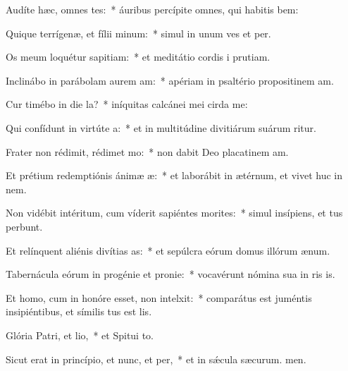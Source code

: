 \item Audíte hæc, omnes tes:~* áuribus percípite omnes, qui habitis bem:
\item Quique terrígenæ, et fílii minum:~* simul in unum ves et per.
\item Os meum loquétur sapitiam:~* et meditátio cordis i prutiam.
\item Inclinábo in parábolam aurem am:~* apériam in psaltério propositinem am.
\item Cur timébo in die la?~* iníquitas calcánei mei cirda me:
\item Qui confídunt in virtúte a:~* et in multitúdine divitiárum suárum ritur.
\item Frater non rédimit, rédimet mo:~* non dabit Deo placatinem am.
\item Et prétium redemptiónis ánimæ æ:~* et laborábit in ætérnum, et vivet huc in nem.
\item Non vidébit intéritum, cum víderit sapiéntes morites:~* simul insípiens, et tus perbunt.
\item Et relínquent aliénis divítias as:~* et sepúlcra eórum domus illórum  ænum.
\item Tabernácula eórum in progénie et pronie:~* vocavérunt nómina sua in ris is.
\item Et homo, cum in honóre esset, non intelxit:~* comparátus est juméntis insipiéntibus, et símilis tus est lis.
\item Glória Patri, et lio,~* et Spitui to.
\item Sicut erat in princípio, et nunc, et per,~* et in sǽcula sæcurum. men.
